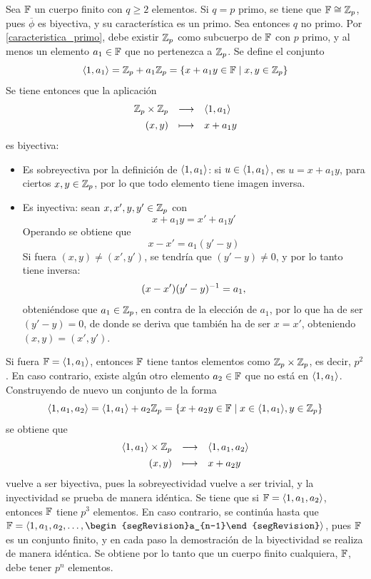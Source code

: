 \begin{dem}{\cite[p.~412]{GamboaAnillos}}
    Sea $\mathbb{F}$ un cuerpo finito con $q\geq2$ elementos. Si $q = p$ primo, se tiene que $\mathbb{F} \cong \mathbb{Z}_p$, pues $\overline{\phi}$ es biyectiva, y su característica es un primo. Sea entonces $q$ no primo. Por \ref{caracteristica_primo}, debe existir $\mathbb{Z}_p$ como subcuerpo de $\mathbb{F}$ con $p$ primo, y al menos un elemento $a_1\in\mathbb{F}$ que no pertenezca a $\mathbb{Z}_p$. Se define el conjunto 
    \[
    \langle1,a_1\rangle = \mathbb{Z}_p + a_1\mathbb{Z}_p = \{x + a_1y \in \mathbb{F}\mid x,y\in \mathbb{Z}_p\}
    \]
    Se tiene entonces que la aplicación 
    \[
    \begin{array}{rcl}
     \mathbb{Z}_p \times \mathbb{Z}_p & \longrightarrow & \langle1,a_1\rangle \\[1ex]
            (x,y) & \longmapsto & x + a_1y
    \end{array}
    \]
    es biyectiva:
    \begin{itemize}[label={--}]
        \item Es sobreyectiva por la definición de $\langle1,a_1\rangle$: si $u\in\langle1,a_1\rangle$, es $u = x + a_1y$, para ciertos $x,y\in\mathbb{Z}_p$, por lo que todo elemento tiene imagen inversa.
        \item Es inyectiva: sean $x,x',y,y'\in\mathbb{Z}_p$ con \[x + a_1y = x' + a_1y'\] Operando se obtiene que \[x - x' = a_1(y'-y)\] Si fuera $(x,y)\neq (x',y')$, se tendría que $(y'-y)\neq 0$, y por lo tanto tiene inversa: \[(x - x')(y'-y)^{-1} = a_1,\] obteniéndose que $a_1\in \mathbb{Z}_p$, en contra de la elección de $a_1$, por lo que ha de ser $(y'-y) = 0$, de donde se deriva que también ha de ser $x = x'$, obteniendo $(x,y) = (x',y')$.
    \end{itemize}
    Si fuera $\mathbb{F} = \langle1,a_1\rangle$, entonces $\mathbb{F}$ tiene tantos elementos como $\mathbb{Z}_p \times \mathbb{Z}_p$, es decir, $p^2$. En caso contrario, existe algún otro elemento $a_2\in \mathbb{F}$ que no está en $\langle1,a_1\rangle$. Construyendo de nuevo un conjunto de la forma 
    \[
    \langle1,a_1,a_2\rangle =  \langle1,a_1\rangle + a_2\mathbb{Z}_p = \{x + a_2y \in \mathbb{F}\mid x\in\langle1,a_1\rangle, y\in \mathbb{Z}_p\}
    \]
    se obtiene que
    \[
    \begin{array}{rcl}
     \langle1,a_1\rangle \times \mathbb{Z}_p & \longrightarrow & \langle1,a_1, a_2\rangle \\[1ex]
            (x,y) & \longmapsto & x + a_2y
    \end{array}
    \]
    vuelve a ser biyectiva, pues la sobreyectividad vuelve a ser trivial, y la inyectividad se prueba de manera idéntica. Se tiene que si $\mathbb{F} = \langle1,a_1,a_2\rangle$, entonces $\mathbb{F}$ tiene $p^3$ elementos. En caso contrario, se continúa hasta que $\F = \gen{1,a_1, a_2, \ldots, \begin{segRevision}a_{n-1}\end{segRevision}}$, pues $\mathbb{F}$ es un conjunto finito, y en cada paso la demostración de la biyectividad se realiza de manera idéntica. Se obtiene por lo tanto que un cuerpo finito cualquiera, $\mathbb{F}$, debe tener $p^n$ elementos.
\end{dem}


